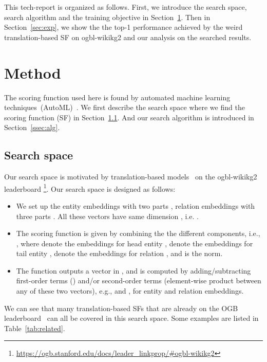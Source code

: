 \documentclass{article}
\begin{document}
This tech-report is organized as follows.
First,
we introduce the search space,
search algorithm
and the training objective in Section~\ref{sec:method}.
Then in Section~\ref{sec:exp}, 
we show the 
the top-1 performance achieved by
the weird translation-based SF on ogbl-wikikg2
and our analysis on the searched results.

\section{Method}
\label{sec:method}

The scoring function used here is found by automated machine learning techniques~(AutoML)~\cite{hutter2019automated,yao2018automl}. 
We first describe the search space where we find the scoring function (SF) in Section~\ref{ssec:space}.
And our search algorithm is introduced in Section~\ref{ssec:alg}. 

\subsection{Search space}
\label{ssec:space}

Our search space is motivated by translation-based models~\cite{bordes2013translating, wang2022interht, long2021triplere, chao2020pairre, zhang2022trans}
on the ogbl-wikikg2 leaderboard
\footnote{\url{https://ogb.stanford.edu/docs/leader_linkprop/#ogbl-wikikg2}}. 
Our search space is designed as follows:
\begin{itemize}
\item We set up the entity embeddings with two parts , 
relation embeddings with three parts . 
All these vectors have same dimension , i.e. .


\item The scoring function is given by combining the the different components,
i.e., , 
where  denote the embeddings for head entity ,
 denote the embeddings for tail entity , 
 denote the embeddings for relation ,
and  is the  norm. 

\item 
The function  outputs a vector in , and is computed by adding/subtracting first-order terms () and/or second-order terms (element-wise product between any of these two vectors), e.g.,  
and
,
for entity and relation embeddings. 
\end{itemize}

We can see that many translation-based SFs that are already on the OGB leaderboard~\cite{hu2020ogb} can all be covered in this search space. 
Some examples are listed in Table~\ref{tab:related}. 
\end{document}
